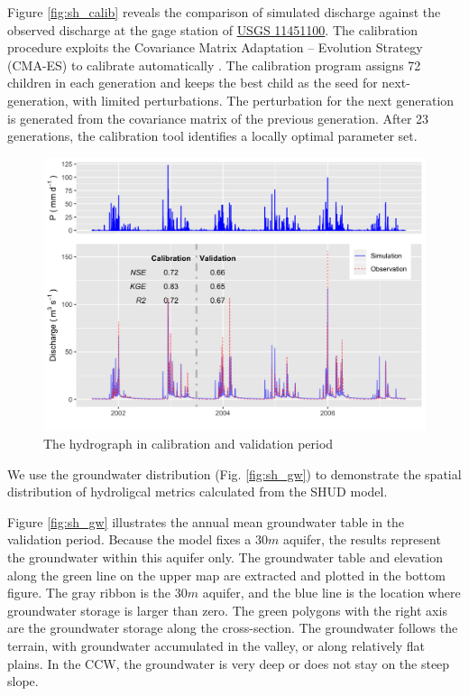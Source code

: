 \documentclass[
]{scrbook}
\begin{document}
Figure \ref{fig:sh_calib} reveals the comparison of simulated discharge against the observed discharge at the gage station of \href{https://waterdata.usgs.gov/ca/nwis/uv/?site_no=11451100}{USGS 11451100}.
The calibration procedure exploits the Covariance Matrix Adaptation -- Evolution Strategy (CMA-ES) to calibrate automatically \citep{Hansen2016}. The calibration program assigns 72 children in each generation and keeps the best child as the seed for next-generation, with limited perturbations. The perturbation for the next generation is generated from the covariance matrix of the previous generation. After 23 generations, the calibration tool identifies a locally optimal parameter set.

\begin{figure}
\centering
\includegraphics{Fig/Example/CacheCreek/sac5_hydrograph_daily.png}
\caption{The hydrograph in calibration and validation period}
\end{figure}

We use the groundwater distribution (Fig. \ref{fig:sh_gw}) to demonstrate the spatial distribution of hydroligcal metrics calculated from the SHUD model.

Figure \ref{fig:sh_gw} illustrates the annual mean groundwater table in the validation period. Because the model fixes a \(30 m\) aquifer, the results represent the groundwater within this aquifer only.
The groundwater table and elevation along the green line on the upper map are extracted and plotted in the bottom figure. The gray ribbon is the \(30 m\) aquifer, and the blue line is the location where groundwater storage is larger than zero. The green polygons with the right axis are the groundwater storage along the cross-section. The groundwater follows the terrain, with groundwater accumulated in the valley, or along relatively flat plains. In the CCW, the groundwater is very deep or does not stay on the steep slope.
\end{document}
